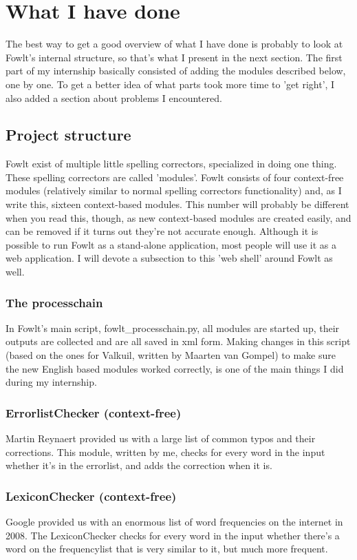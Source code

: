 \documentclass[12pt]{article}
\let\stdsection\section
\renewcommand\section{\newpage\stdsection}
\begin{document}
\section{What I have done}
The best way to get a good overview of what I have done is probably to look at Fowlt's internal structure, so that's what I present in the next section. The first part of my internship basically consisted of adding the modules described below, one by one. To get a better idea of what parts took more time to 'get right', I also added a section about problems I encountered.

\subsection{Project structure}
Fowlt exist of multiple little spelling correctors, specialized in doing one thing. These spelling correctors are called 'modules'. Fowlt consists of four context-free modules (relatively similar to normal spelling correctors functionality) and, as I write this, sixteen context-based modules. This number will probably be different when you read this, though, as new context-based modules are created easily, and can be removed if it turns out they're not accurate enough. Although it is possible to run Fowlt as a stand-alone application, most people will use it as a web application. I will devote a subsection to this 'web shell' around Fowlt as well.


\subsubsection{The processchain}
In Fowlt's main script, fowlt\_processchain.py, all modules are started up, their outputs are collected and are all saved in xml form. Making changes in this script (based on the ones for Valkuil, written by Maarten van Gompel) to make sure the new English based modules worked correctly, is one of the main things I did during my internship. 

\subsubsection{ErrorlistChecker (context-free)}
Martin Reynaert provided us with a large list of common typos and their corrections. This module, written by me, checks for every word in the input whether it's in the errorlist, and adds the correction when it is.

\subsubsection{LexiconChecker (context-free)}
Google provided us with an enormous list of word frequencies on the internet in 2008. The LexiconChecker checks for every word in the input whether there's a word on the frequencylist that is very similar to it, but much more frequent.
\end{document}
